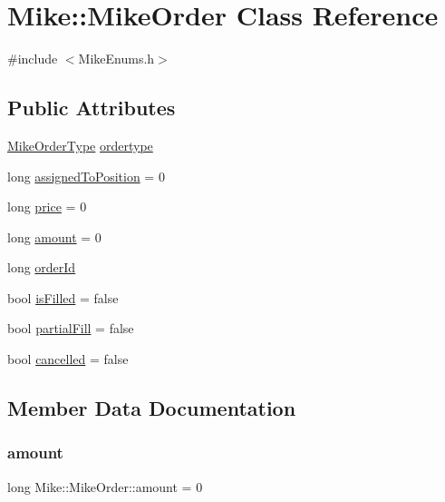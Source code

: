 \hypertarget{class_mike_1_1_mike_order}{}\section{Mike\+:\+:Mike\+Order Class Reference}
\label{class_mike_1_1_mike_order}


{\ttfamily \#include $<$Mike\+Enums.\+h$>$}

\subsection*{Public Attributes}
\begin{DoxyCompactItemize}
\item 
\hyperlink{namespace_mike_aa486aea8b1d0d07190982a311394e6cb}{Mike\+Order\+Type} \hyperlink{class_mike_1_1_mike_order_aa1acb12d7013d32b53c7aff946d2cbc8}{ordertype}
\item 
long \hyperlink{class_mike_1_1_mike_order_a4a74a640c2244eab7773339420d8c7a2}{assigned\+To\+Position} = 0
\item 
long \hyperlink{class_mike_1_1_mike_order_a134e751155f6f3c72c9cd600a9865d8f}{price} = 0
\item 
long \hyperlink{class_mike_1_1_mike_order_a77fd8fad7c335dce6f3543d640e2f223}{amount} = 0
\item 
long \hyperlink{class_mike_1_1_mike_order_a223c686cb5a0fe6e58926aa3d7e14381}{order\+Id}
\item 
bool \hyperlink{class_mike_1_1_mike_order_a835f8f61eb1eb1afcc409a5633612045}{is\+Filled} = false
\item 
bool \hyperlink{class_mike_1_1_mike_order_af03e7280847c51ac707e60727474b390}{partial\+Fill} = false
\item 
bool \hyperlink{class_mike_1_1_mike_order_a05565a668fb0ce47f2487c6de8a3fc38}{cancelled} = false
\end{DoxyCompactItemize}


\subsection{Member Data Documentation}
\mbox{\label{class_mike_1_1_mike_order_a77fd8fad7c335dce6f3543d640e2f223}} 
\subsubsection{\texorpdfstring{amount}{amount}}
{\footnotesize\ttfamily long Mike\+::\+Mike\+Order\+::amount = 0}

